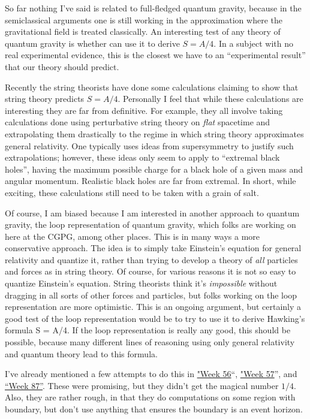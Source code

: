 \documentclass{article}
\begin{document}
So far nothing I've said is related to full-fledged quantum gravity,
because in the semiclassical arguments one is still working in the
approximation where the gravitational field is treated classically. An
interesting test of any theory of quantum gravity is whether can use it
to derive \(S = A/4\). In a subject with no real experimental evidence,
this is the closest we have to an ``experimental result'' that our
theory should predict.

Recently the string theorists have done some calculations claiming to
show that string theory predicts \(S = A/4\). Personally I feel that
while these calculations are interesting they are far from definitive.
For example, they all involve taking calculations done using
perturbative string theory on \emph{flat} spacetime and extrapolating
them drastically to the regime in which string theory approximates
general relativity. One typically uses ideas from supersymmetry to
justify such extrapolations; however, these ideas only seem to apply to
``extremal black holes'', having the maximum possible charge for a black
hole of a given mass and angular momentum. Realistic black holes are far
from extremal. In short, while exciting, these calculations still need
to be taken with a grain of salt.

Of course, I am biased because I am interested in another approach to
quantum gravity, the loop representation of quantum gravity, which folks
are working on here at the CGPG, among other places. This is in many
ways a more conservative approach. The idea is to simply take Einstein's
equation for general relativity and quantize it, rather than trying to
develop a theory of \emph{all} particles and forces as in string theory.
Of course, for various reasons it is not so easy to quantize Einstein's
equation. String theorists think it's \emph{impossible} without dragging
in all sorts of other forces and particles, but folks working on the
loop representation are more optimistic. This is an ongoing argument,
but certainly a good test of the loop representation would be to try to
use it to derive Hawking's formula S = A/4. If the loop representation
is really any good, this should be possible, because many different
lines of reasoning using only general relativity and quantum theory lead
to this formula.

I've already mentioned a few attempts to do this in
\protect\hyperlink{week56}{"Week 56}``, \protect\hyperlink{week57}{"Week
57}'', and \protect\hyperlink{week87}{``Week 87''}. These were
promising, but they didn't get the magical number \(1/4\). Also, they
are rather rough, in that they do computations on some region with
boundary, but don't use anything that ensures the boundary is an event
horizon.
\end{document}

